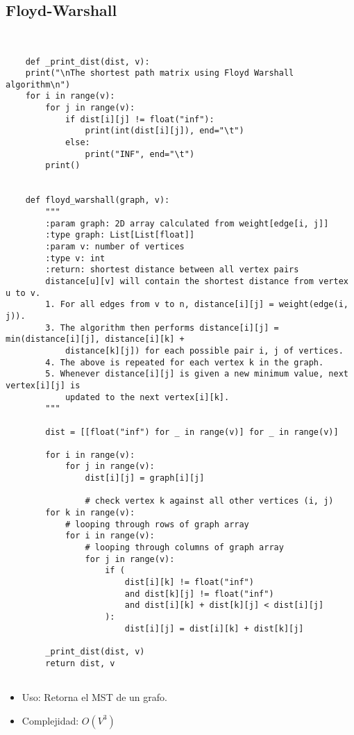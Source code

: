 \documentclass[a4paper]{article}
\begin{document}
\subsection{Floyd-Warshall}
\begin{verbatim}


    def _print_dist(dist, v):
    print("\nThe shortest path matrix using Floyd Warshall algorithm\n")
    for i in range(v):
        for j in range(v):
            if dist[i][j] != float("inf"):
                print(int(dist[i][j]), end="\t")
            else:
                print("INF", end="\t")
        print()


    def floyd_warshall(graph, v):
        """
        :param graph: 2D array calculated from weight[edge[i, j]]
        :type graph: List[List[float]]
        :param v: number of vertices
        :type v: int
        :return: shortest distance between all vertex pairs
        distance[u][v] will contain the shortest distance from vertex u to v.
        1. For all edges from v to n, distance[i][j] = weight(edge(i, j)).
        3. The algorithm then performs distance[i][j] = min(distance[i][j], distance[i][k] +
            distance[k][j]) for each possible pair i, j of vertices.
        4. The above is repeated for each vertex k in the graph.
        5. Whenever distance[i][j] is given a new minimum value, next vertex[i][j] is
            updated to the next vertex[i][k].
        """

        dist = [[float("inf") for _ in range(v)] for _ in range(v)]

        for i in range(v):
            for j in range(v):
                dist[i][j] = graph[i][j]

                # check vertex k against all other vertices (i, j)
        for k in range(v):
            # looping through rows of graph array
            for i in range(v):
                # looping through columns of graph array
                for j in range(v):
                    if (
                        dist[i][k] != float("inf")
                        and dist[k][j] != float("inf")
                        and dist[i][k] + dist[k][j] < dist[i][j]
                    ):
                        dist[i][j] = dist[i][k] + dist[k][j]

        _print_dist(dist, v)
        return dist, v


\end{verbatim}

\begin{itemize}
    \item Uso: Retorna el MST de un grafo.
    \item Complejidad: $O(V^3)$
    
\end{itemize}
\end{document}
